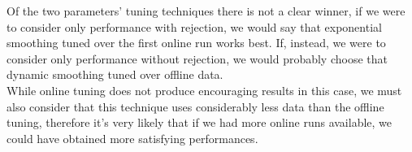Of the two parameters' tuning techniques there is not a clear winner, if we were to consider only performance with rejection, we would say that exponential smoothing tuned over the first online run works best. If, instead, we were to consider only performance without rejection, we would probably choose that dynamic smoothing tuned over offline data. \\

While online tuning does not produce encouraging results in this case, we must also consider that this technique uses considerably less data than the offline tuning, therefore it's very likely that if we had more online runs available, we could have obtained more satisfying performances.







